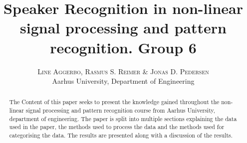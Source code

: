 

\title{
	\vspace{-15mm}
	\fontsize{24pt}{10pt}
	\selectfont
	\textbf{Speaker Recognition in non-linear signal processing and pattern recognition.
	 \vspace{5mm} \Large Group 6}
}

\author{
	\large
	\textsc{Line Aggerbo, Rasmus S. Reimer \& Jonas D. Pedersen}\\[2mm]
	\normalsize Aarhus University, Department of Engineering \\
	\vspace{-5mm}
}
\date{}




\maketitle
\thispagestyle{fancy} %
\raggedright



\begin{abstract}
The Content of this paper seeks to present the knowledge gained throughout the non-linear signal processing and pattern recognition course from Aarhus University, department of engineering. The paper is split into multiple sections explaining the data used in the paper, the methods used to process the data and the methods used for categorising the data. The results are presented along with a discussion of the results. 
\end{abstract}













\begingroup
	\raggedright
	
\endgroup


